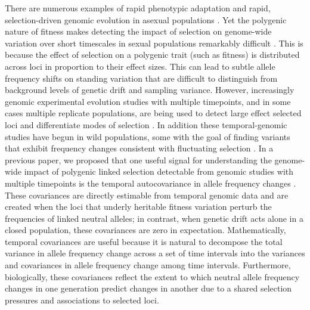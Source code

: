 \documentclass[11pt]{article}
\newcommand{\vb}[1]{{\it \color{blue} #1}}
\begin{document}
There are numerous examples of rapid phenotypic adaptation
\parencite{Grant2011-wk,Grant2006-hj,Reznick1997-mh,Franks2007-dr} and rapid,
selection-driven genomic evolution in asexual populations
\parencite{Good2017-om,Bennett1990-bc,Baym2016-kh}.  Yet the polygenic nature
of fitness makes detecting the impact of selection on genome-wide variation
over short timescales in sexual populations remarkably difficult
\vb{\parencite{Latta1998-me, Pritchard2010-tk,Kemper2014-bx}}. This is because
the effect of selection on a polygenic trait (such as fitness) is distributed
across loci in proportion to their effect sizes. This can lead to subtle allele
frequency shifts on standing variation that are difficult to distinguish from
background levels of genetic drift and sampling variance.  However,
increasingly genomic experimental evolution studies with multiple timepoints,
and in some cases multiple replicate populations, are being used to detect
large effect selected loci \parencite{Turner2011-sx,Turner2012-bm} and
differentiate modes of selection
\parencite{Burke2010-tz,Barghi2019-qy,Therkildsen2019-zy}.  In addition these
temporal-genomic studies have begun in wild populations, some with the goal of
finding variants that exhibit frequency changes consistent with fluctuating
selection \parencite{Bergland2014-ij,Machado2018-cs}. In a previous paper, we
proposed that one useful signal for understanding the genome-wide impact of
polygenic linked selection detectable from genomic studies with multiple
timepoints is the temporal autocovariance in allele frequency changes
\parencite{Buffalo2019-io}.  These covariances are directly estimable from
temporal genomic data and are created when the loci that underly heritable
fitness variation perturb the frequencies of linked neutral alleles; in
contrast, when genetic drift acts alone in a closed population, these
covariances are zero in expectation.  Mathematically, temporal covariances are
useful because it is natural to decompose the total variance in allele
frequency change across a set of time intervals into the variances and
covariances in allele frequency change among time intervals. Furthermore,
biologically, these covariances reflect the extent to which neutral allele
frequency changes in one generation predict changes in another due to a shared
selection pressures and associations to selected loci.
\end{document}
